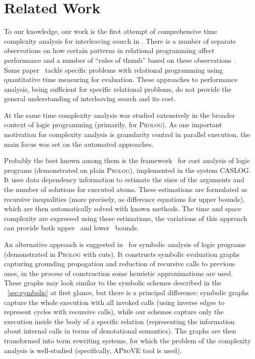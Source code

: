 \section{Related Work}
\label{sec:related}

To our knowledge, our work is the first attempt of comprehensive time complexity analysis for interleaving search in \mK.
There is a number of separate observations on how certain patterns in relational programming affect performance and a number
of ``rules of thumb'' based on these observations~\cite{WillsThesis}. Some paper~\cite{GuardedFresh, FloatArithmetics, UniversalQuantification} tackle
specific problems with relational programming using quantitative time measuring for evaluation. These approaches to performance analysis, being sufficient
for specific relational problems, do not provide the general understanding of interleaving search and its cost.

At the same time complexity analysis was studied extensively in the broader context of logic programming (primarily, for \textsc{Prolog}).
As one important motivation for complexity analysis is granularity control in parallel execution, the main focus was set on the automated approaches.

Probably the best known among them is the framework~\cite{CostAnalysisLP} for cost analysis of logic programs (demonstrated on plain \textsc{Prolog}),
implemented in the system \textsc{CASLOG}. It uses data dependency information to estimate the sizes of the arguments and the number of solutions for
executed atoms. These estimations are formulated as recursive inequalities (more precisely, as difference equations for upper bounds), which are then
automatically solved with known methods. The time and space complexity are expressed using these estimations, the variations of this approach can
provide both upper~\cite{CostAnalysisLP} and lower~\cite{CostAnalysisLPLower} bounds.

An alternative approach is suggested in~\cite{SymbolicAnalysisLP} for symbolic analysis of logic programs (demonstrated in \textsc{Prolog} with cuts).
It constructs symbolic evaluation graphs capturing grounding propagation and reduction of recursive calls to previous ones, in the process of construction
some heuristic approximations are used. These graphs may look similar to the symbolic schemes described in the \sectionword~\ref{sec:symbolic} at first glance,
but there is a principal difference: symbolic graphs capture the whole execution with all invoked calls (using inverse edges to represent cycles with recursive calls),
while our schemes capture only the execution inside the body of a specific relation (representing the information about internal calls in terms of denotational semantics).
The graphs are then transformed into term rewriting systems, for which the problem of the complexity analysis is well-studied (specifically, \textsc{AProVE} tool is used).


